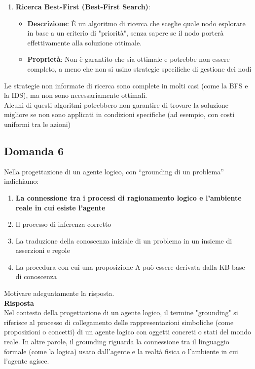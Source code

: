 \documentclass[../main.tex]{subfiles}
\begin{document}
\begin{enumerate}
\begin{itemize}
			\item \textbf{Descrizione}: Combina la profondità limitata e la ricerca in ampiezza, eseguendo iterazioni della DFS con limiti di profondità crescenti.
			\item \textbf{Proprietà}: È completo e garantisce di trovare la soluzione ottimale (se tutte le azioni hanno lo stesso costo). Tuttavia, ha una complessità computazionale superiore rispetto alla ricerca in ampiezza, poiché riesegue le stesse operazioni più volte.
		\end{itemize}
		\item \textbf{Ricerca Best-First (Best-First Search)}:
		\begin{itemize}
			\item \textbf{Descrizione}: È un algoritmo di ricerca che sceglie quale nodo esplorare in base a un criterio di "priorità", senza sapere se il nodo porterà effettivamente alla soluzione ottimale.
			\item \textbf{Proprietà}: Non è garantito che sia ottimale e potrebbe non essere completo, a meno che non si usino strategie specifiche di gestione dei nodi
		\end{itemize}
	\end{enumerate}
	Le strategie non informate di ricerca sono complete in molti casi (come la BFS e la IDS), ma non sono necessariamente ottimali.\\
	Alcuni di questi algoritmi potrebbero non garantire di trovare la soluzione migliore se non sono applicati in condizioni specifiche (ad esempio, con costi uniformi tra le azioni)
	\subsection{Domanda 6}
	Nella progettazione di un agente logico, con “grounding di un problema” indichiamo:
	\begin{enumerate}
		\item \textbf{La connessione tra i processi di ragionamento logico e l'ambiente reale in cui esiste l'agente}
		\item Il processo di inferenza corretto 
		\item La traduzione della conoscenza iniziale di un problema in un insieme di asserzioni e regole 
		\item La procedura con cui una proposizione A può essere derivata dalla KB base di conoscenza 
	\end{enumerate} 
	Motivare adeguatamente la risposta.\\
	\textbf{Risposta}\\
	Nel contesto della progettazione di un agente logico, il termine "grounding" si riferisce al processo di collegamento delle rappresentazioni simboliche (come proposizioni o concetti) di un agente logico con oggetti concreti o stati del mondo reale. In altre parole, il grounding riguarda la connessione tra il linguaggio formale (come la logica) usato dall'agente e la realtà fisica o l'ambiente in cui l'agente agisce.
\end{document}
